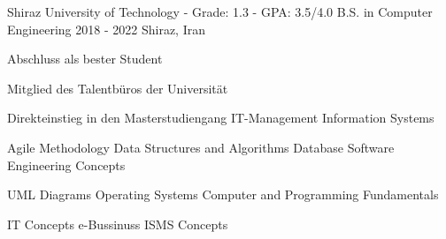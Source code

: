 \begin{cventries}

\cventry
  {Shiraz University of Technology - Grade: 1.3 - GPA: 3.5/4.0} %
  {B.S. in Computer Engineering} %
  {2018 - 2022} %
  {Shiraz, Iran} %
  {
    \begin{cvitems}
      \item {Abschluss als bester Student} 
      \item {Mitglied des Talentbüros der Universität} 
      \item {Direkteinstieg in den Masterstudiengang IT-Management Information Systems}
    \end{cvitems}
    \vspace{5mm}
    \vspace{5mm}
    \begin{cvitems}
      \item {
        {Agile Methodology}
        \mitdiv
        {Data Structures and Algorithms} 
        \mitdiv 
        {Database}
        \mitdiv
        {Software Engineering Concepts}
      } 
      \item {
        {UML Diagrams}
        \mitdiv
        {Operating Systems}
        \mitdiv
        {Computer and Programming Fundamentals}
      } 
      \item {
        {IT Concepts}
        \mitdiv
        {e-Bussinuss}
        \mitdiv
        {ISMS Concepts}
      }
    \end{cvitems}
  }
\end{cventries}
